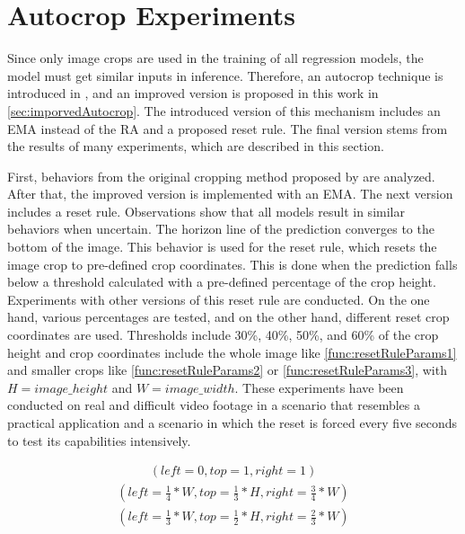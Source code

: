 \section{Autocrop Experiments}
\label{sec:autocropExperiments}

Since only image crops are used in the training of all regression models, the model must get similar inputs in inference.
Therefore, an autocrop technique is introduced in \cite{tepNet2024}, and an improved version is proposed in this work in \autoref{sec:imporvedAutocrop}.
The introduced version of this mechanism includes an \ac{EMA} instead of the \ac{RA} and a proposed reset rule.
The final version stems from the results of many experiments, which are described in this section.

First, behaviors from the original cropping method proposed by \cite{tepNet2024} are analyzed.
After that, the improved version is implemented with an \ac{EMA}.
The next version includes a reset rule.
Observations show that all models result in similar behaviors when uncertain.
The horizon line of the prediction converges to the bottom of the image.
This behavior is used for the reset rule, which resets the image crop to pre-defined crop coordinates.
This is done when the prediction falls below a threshold calculated with a pre-defined percentage of the crop height.
Experiments with other versions of this reset rule are conducted.
On the one hand, various percentages are tested, and on the other hand, different reset crop coordinates are used.
Thresholds include 30\%, 40\%, 50\%, and 60\% of the crop height and crop coordinates include the whole image like \autoref{func:resetRuleParams1} and smaller crops like \autoref{func:resetRuleParams2} or \autoref{func:resetRuleParams3}, with $H=image\_height$ and $W=image\_width$.
These experiments have been conducted on real and difficult video footage in a scenario that resembles a practical application and a scenario in which the reset is forced every five seconds to test its capabilities intensively.

\begin{align}
    (left=0, top=1, right=1)
    \label{func:resetRuleParams1}
\end{align}
\begin{align}
    (left=\frac{1}{4}*W, top=\frac{1}{3}*H, right=\frac{3}{4}*W)
    \label{func:resetRuleParams2}
\end{align}
\begin{align}
    (left=\frac{1}{3}*W, top=\frac{1}{2}*H, right=\frac{2}{3}*W)
    \label{func:resetRuleParams3}
\end{align}


